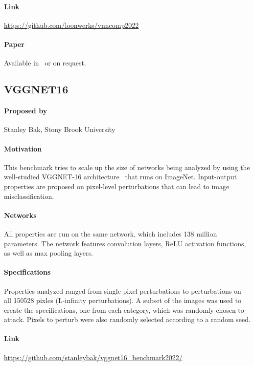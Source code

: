 \documentclass[oneside,11pt,dvipsnames]{book}
\begin{document}
\paragraph*{Link} \url{https://github.com/loonwerks/vnncomp2022}

\paragraph*{Paper} Available in~\cite{kirov2023benchmark} or on request.


\subsection{VGGNET16}
\paragraph*{Proposed by} Stanley Bak, Stony Brook University

\paragraph*{Motivation} This benchmark tries to scale up the size of networks being analyzed by using the well-studied VGGNET-16 architecture~\cite{simonyan2014very} that runs on ImageNet. Input-output properties are proposed on pixel-level perturbations that can lead to image misclassification. 

\paragraph*{Networks} All properties are run on the same network, which includes 138 million parameters. The network features convolution layers, ReLU activation functions, as well as max pooling layers.

\paragraph*{Specifications} Properties analyzed ranged from single-pixel perturbations to perturbations on all 150528 pixles (L-infinity perturbations). A subset of the images was used to create the specifications, one from each category, which was randomly chosen to attack. Pixels to perturb were also randomly selected according to a random seed.

\paragraph*{Link} \url{https://github.com/stanleybak/vggnet16_benchmark2022/}
\end{document}
